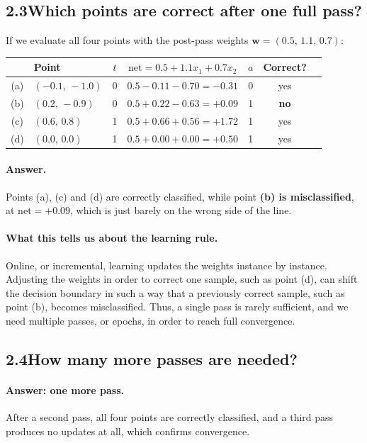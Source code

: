 \documentclass[11pt]{article}
\newcommand{\net}{\mathrm{net}}
\newcommand{\bw}{\mathbf{w}}
\begin{document}
\subsection*{2.3\quad Which points are correct after one full pass?}

If we evaluate all four points with the post-pass weights $\bw = (0.5,\,1.1,\,0.7)$:

\begin{table}[H]
\centering
\begin{tabular}{clccccl}
\toprule
& Point & $t$ & $\net = 0.5 + 1.1x_1 + 0.7x_2$ & $a$ & Correct? \\
\midrule
(a) & $(-0.1,\,-1.0)$ & 0 & $0.5 - 0.11 - 0.70 = -0.31$ & 0 & yes \\
(b) & $(0.2,\,-0.9)$  & 0 & $0.5 + 0.22 - 0.63 = +0.09$ & 1 & \textbf{no} \\
(c) & $(0.6,\,0.8)$   & 1 & $0.5 + 0.66 + 0.56 = +1.72$ & 1 & yes \\
(d) & $(0.0,\,0.0)$   & 1 & $0.5 + 0.00 + 0.00 = +0.50$ & 1 & yes \\
\bottomrule
\end{tabular}
\end{table}

\paragraph{Answer.} Points (a), (c) and (d) are correctly classified, while point
\textbf{(b) is misclassified}, at $\net = +0.09$, which is just barely on the wrong side of
the line.

\paragraph{What this tells us about the learning rule.}
Online, or incremental, learning updates the weights instance by instance. Adjusting the
weights in order to correct one sample, such as point (d), can shift the decision boundary
in such a way that a previously correct sample, such as point (b), becomes misclassified.
Thus, a single pass is rarely sufficient, and we need multiple passes, or epochs, in order
to reach full convergence.

\subsection*{2.4\quad How many more passes are needed?}

\paragraph{Answer: \textbf{one} more pass.} After a second pass, all four points are
correctly classified, and a third pass produces no updates at all, which confirms
convergence.
\end{document}
